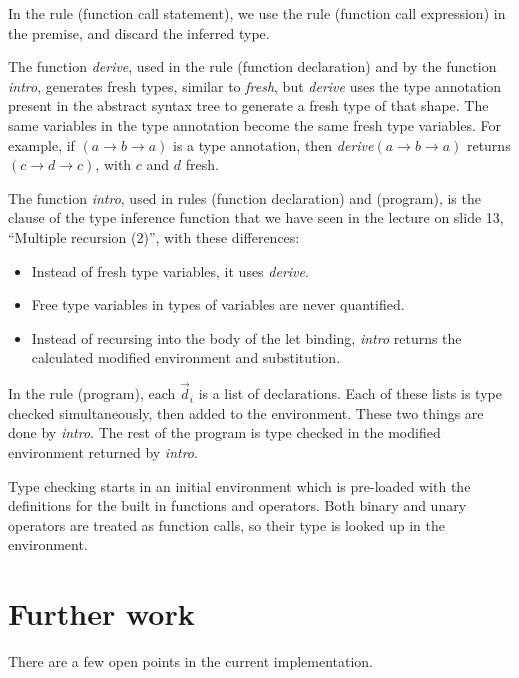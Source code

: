 \documentclass[a4paper]{article}
\newcommand{\arr}{\rightarrow}
\begin{document}
In the rule (function call statement), we use the rule (function call
expression) in the premise, and discard the inferred type.

The function \emph{derive}, used in the rule (function declaration) and by the
function \emph{intro}, generates fresh types, similar to \emph{fresh}, but
\emph{derive} uses the type annotation present in the abstract syntax tree to
generate a fresh type of that shape.  The same variables in the type annotation
become the same fresh type variables.  For example, if $(a \arr b \arr a)$ is a
type annotation, then \emph{derive}$(a \arr b \arr a)$ returns $(c \arr d \arr
c)$, with $c$ and $d$ fresh.

The function \emph{intro}, used in rules (function declaration) and (program),
is the clause of the type inference function that we have seen in the lecture on
slide 13, ``Multiple recursion (2)'', with these differences:

\begin{itemize}

  \item Instead of fresh type variables, it uses \emph{derive}.

  \item Free type variables in types of variables are never quantified.

  \item Instead of recursing into the body of the let binding, \emph{intro}
  returns the calculated modified environment and substitution.

\end{itemize}

In the rule (program), each $\vec{d}_i$ is a list of declarations.  Each of
these lists is type checked simultaneously, then added to the environment.
These two things are done by \emph{intro}.  The rest of the program is type
checked in the modified environment returned by \emph{intro}.

Type checking starts in an initial environment which is pre-loaded with the
definitions for the built in functions and operators.  Both binary and unary
operators are treated as function calls, so their type is looked up in the
environment.

\section{Further work}

There are a few open points in the current implementation.
\end{document}
